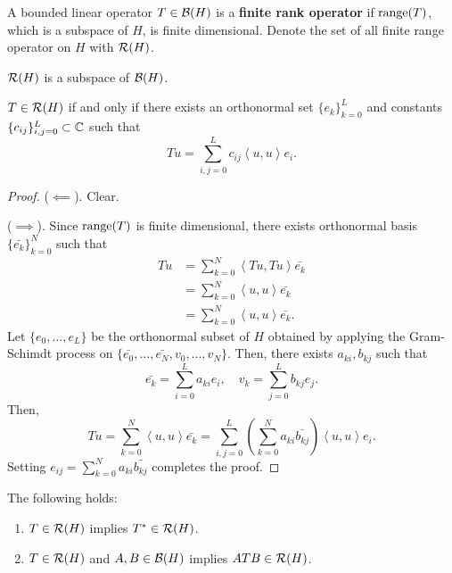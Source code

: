 \documentclass[a4paper]{article}
\renewcommand{\braket}[2]{\left\langle #1, #1 \right\rangle}
\begin{document}
\begin{defi}
  A bounded linear operator $T \in \mathcal{B}(H)$ is a \textbf{finite
    rank operator} if $\operatorname{range}(T)$, which is a subspace of $H$,
  is finite dimensional. Denote the set of all finite range
  operator on $H$ with $\mathcal{R} (H)$.
\end{defi}

\begin{thm}
  $\mathcal{R} (H)$ is a subspace of $\mathcal{B} (H)$.
\end{thm}

\begin{thm}
  $T \in \mathcal{R} (H)$ if and only if there exists an
  orthonormal set $\{e_k\}_{k=0}^L$ and constants
  $\{c_{ij}\}_{i,j=0}^L \subset \mathbb{C}$ such that
  \[
    T u = \sum_{i, j = 0}^L c_{ij} \braket{u}{e_j} e_i.
  \]
\end{thm}

\begin{proof}
  ($\impliedby$). Clear.

  ($\implies$). Since $\operatorname{range}(T)$ is finite dimensional, there
  exists orthonormal basis $\{\bar{e_k}\}_{k=0}^N$ such that
  \[
    \begin{aligned}
      T u
       & = \sum_{k=0}^N \braket{T u}{\bar{e_k}} \bar{e_k}   \\
       & = \sum_{k=0}^N \braket{u}{T^* \bar{e_k}} \bar{e_k} \\
       & = \sum_{k=0}^N \braket{u}{v_k} \bar{e_k}.
    \end{aligned}
  \]
  Let $\{e_0, \dots, e_L\}$ be the orthonormal subset
  of $H$ obtained by applying the Gram-Schimdt process
  on $\{\bar{e_0}, \dots, \bar{e_N}, v_0, \dots, v_N\}$.
  Then, there exists $a_{ki}, b_{kj}$ such that
  \[
    \bar{e_k} = \sum_{i=0}^L a_{ki} e_i, \quad
    v_k = \sum_{j=0}^L b_{kj} e_j.
  \]
  Then,
  \[
    T u = \sum_{k=0}^N \braket{u}{v_k} \bar{e_k}
    = \sum_{i, j = 0}^L \left( \sum_{k=0}^N a_{ki}
    \bar{b_{kj}} \right) \braket{u}{e_j} e_i.
  \]
  Setting $e_{ij} = \sum_{k=0}^N a_{ki} \bar{b_{kj}}$
  completes the proof.
\end{proof}

\begin{thm}
  The following holds:
  \begin{enumerate}
    \item $T \in \mathcal{R}(H)$ implies $T^* \in \mathcal{R} (H)$.
    \item $T \in \mathcal{R}(H)$ and $A, B \in \mathcal{B}(H)$ implies
          $A T B \in \mathcal{R}(H)$.
  \end{enumerate}
\end{thm}
\end{document}
